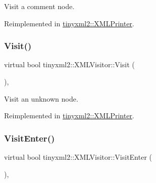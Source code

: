 Visit a comment node. 



Reimplemented in \hyperlink{classtinyxml2_1_1_x_m_l_printer_aa294c5c01af0ebb9114902456e4cb53c}{tinyxml2\+::\+X\+M\+L\+Printer}.

\mbox{\label{classtinyxml2_1_1_x_m_l_visitor_a14e4748387c34bf53d24e8119bb1f292}} 
\subsubsection{\texorpdfstring{Visit()}{Visit()}\hspace{0.1cm}{\footnotesize\ttfamily [4/4]}}
{\footnotesize\ttfamily virtual bool tinyxml2\+::\+X\+M\+L\+Visitor\+::\+Visit (\begin{DoxyParamCaption}\item[{const \hyperlink{classtinyxml2_1_1_x_m_l_unknown}{X\+M\+L\+Unknown} \&}]{ }\end{DoxyParamCaption})\hspace{0.3cm}{\ttfamily [inline]}, {\ttfamily [virtual]}}



Visit an unknown node. 



Reimplemented in \hyperlink{classtinyxml2_1_1_x_m_l_printer_ab8af5455bbf9e4be2663e6642fcd7e32}{tinyxml2\+::\+X\+M\+L\+Printer}.

\mbox{\label{classtinyxml2_1_1_x_m_l_visitor_acb3c22fc5f60eb9db98f533f2761f67d}} 
\subsubsection{\texorpdfstring{Visit\+Enter()}{VisitEnter()}\hspace{0.1cm}{\footnotesize\ttfamily [1/2]}}
{\footnotesize\ttfamily virtual bool tinyxml2\+::\+X\+M\+L\+Visitor\+::\+Visit\+Enter (\begin{DoxyParamCaption}\item[{const \hyperlink{classtinyxml2_1_1_x_m_l_document}{X\+M\+L\+Document} \&}]{ }\end{DoxyParamCaption})\hspace{0.3cm}{\ttfamily [inline]}, {\ttfamily [virtual]}}



